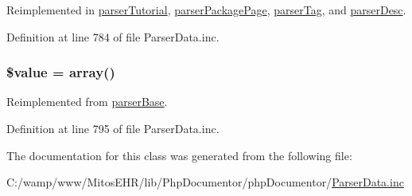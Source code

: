 \-Reimplemented in \hyperlink{classparser_tutorial_a9a4a6fba2208984cabb3afacadf33919}{parser\-Tutorial}, \hyperlink{classparser_package_page_a9a4a6fba2208984cabb3afacadf33919}{parser\-Package\-Page}, \hyperlink{classparser_tag_a9a4a6fba2208984cabb3afacadf33919}{parser\-Tag}, and \hyperlink{classparser_desc_a9a4a6fba2208984cabb3afacadf33919}{parser\-Desc}.



\-Definition at line 784 of file \-Parser\-Data.\-inc.

\hypertarget{classparser_string_with_inline_tags_a0f298096f322952a72a50f98a74c7b60}{
\subsubsection[{\$value}]{\setlength{\rightskip}{0pt plus 5cm}\$value = array()}}\label{classparser_string_with_inline_tags_a0f298096f322952a72a50f98a74c7b60}


\-Reimplemented from \hyperlink{classparser_base_a0f298096f322952a72a50f98a74c7b60}{parser\-Base}.



\-Definition at line 795 of file \-Parser\-Data.\-inc.



\-The documentation for this class was generated from the following file\-:\begin{DoxyCompactItemize}
\item 
\-C\-:/wamp/www/\-Mitos\-E\-H\-R/lib/\-Php\-Documentor/php\-Documentor/\hyperlink{_parser_data_8inc}{\-Parser\-Data.\-inc}\end{DoxyCompactItemize}

